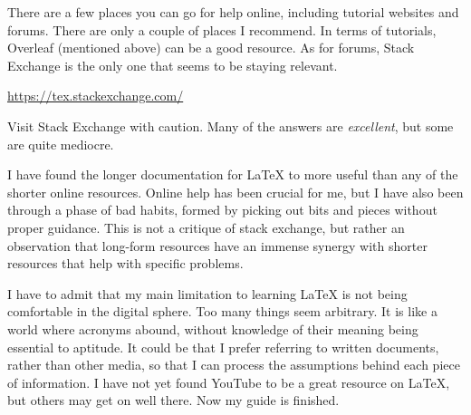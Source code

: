 \documentclass[11pt, oneside]{memoir}
\begin{document}
There are a few places you can go for help online, including tutorial websites and forums. There are only a couple of places I recommend. In terms of tutorials, Overleaf (mentioned above) can be a good resource. As for forums, Stack Exchange is the only one that seems to be staying relevant.

\url{https://tex.stackexchange.com/}

Visit Stack Exchange with caution. Many of the answers are \emph{excellent}, but some are quite mediocre.

I have found the longer documentation for LaTeX to more useful than any of the shorter online resources. Online help has been crucial for me, but I have also been through a phase of bad habits, formed by picking out bits and pieces without proper guidance. This is not a critique of stack exchange, but rather an observation that long-form resources have an immense synergy with shorter resources that help with specific problems.

I have to admit that my main limitation to learning LaTeX is not being comfortable in the digital sphere. Too many things seem arbitrary. It is like a world where acronyms abound, without knowledge of their meaning being essential to aptitude. It could be that I prefer referring to written documents, rather than other media, so that I can process the assumptions behind each piece of information. I have not yet found YouTube to be a great resource on LaTeX, but others may get on well there.
\newpage
\thispagestyle{empty}
Now my guide is finished.
\end{document}
